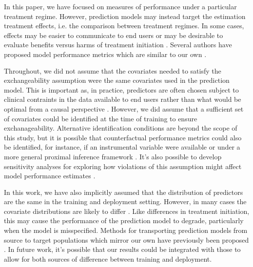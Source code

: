 In this paper, we have focused on measures of performance under a particular treatment regime. However, prediction models may instead target the estimation treatment effects, i.e. the comparison between treatment regimes. In some cases, effects may be easier to communicate to end users or may be desirable to evaluate benefits versus harms of treatment initiation \cite{kent_predictive_2020}. Several authors have proposed model performance metrics which are similar to our own \cite{schuler_comparison_2018,rolling2014model,xu_calibration_2022,van2003unified,alaa_validating_2019}.

Throughout, we did not assume that the covariates needed to satisfy the exchangeability assumption were the same covariates used in the prediction model. This is important as, in practice,  predictors are often chosen subject to clinical contraints in the data available to end users rather than what would be optimal from a causal perspective \cite{steyerberg_clinical_2019}. However, we did assume that a sufficient set of covariates could be identified at the time of training to ensure exchanageability. Alternative identification conditions are beyond the scope of this study, but it is possible that counterfactual performance metrics could also be identified, for instance, if an instrumental variable \cite{hernan_instruments_2006} were available or under a more general proximal inference framework \cite{tchetgen_introduction_2020}. It's also possible to develop sensitivity analyses for exploring how violations of this assumption might affect model performance estimates \cite{robins_sensitivity_2000}.

In this work, we have also implicitly assumed that the distribution of predictors are the same in the training and deployment setting. However, in many cases the covariate distributions are likely to differ \cite{bickel_discriminative_2009,sugiyama_covariate_2007}. Like differences in treatment initiation, this may cause the performance of the prediction model to degrade, particularly when the model is misspecified. Methods for transporting prediction models from source to target populations which mirror our own have previously been proposed \cite{steingrimsson_extending_2022,steingrimsson_transporting_2021,li_estimating_2022,morrison_robust_2022}. In future work, it's possible that our results could be integrated with those to allow for both sources of difference between training and deployment.


